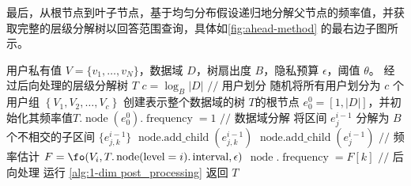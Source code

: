最后，从根节点到叶子节点，\myahead 基于均匀分布假设递归地分解父节点的频率值，并获取完整的层级分解树以回答范围查询，具体如\autoref{fig:ahead-method} 的最右边子图所示。

\begin{algorithm}[!htbp]
	\begin{algorithmic}[1]
        \REQUIRE 用户私有值 $V=\{v_1, \ldots, v_N\}$，数据域 $D$，树扇出度 $B$，隐私预算 $\epsilon$，阈值 $\theta$。
        \ENSURE 经过后向处理的\myahead 层级分解树 $T$
		\STATE $c = {\log_B}|D|$
		\STATE $//$ 用户划分
        \STATE 随机将所有用户划分为 $c$ 个用户组 $\left\{ V_1, V_2, \ldots, V_c \right\}$
        \STATE 创建表示整个数据域的树 $T$的根节点 $e^0_0 = [1, |D|]$，并初始化其频率值$T.\operatorname{node}(e^0_0).\operatorname{frequency} = 1$
            \STATE $//$ 数据域分解
            \STATE 将区间 $e^{i-1}_j$ 分解为 $B$ 个不相交的子区间 $\{e^{i-1}_{j,k}\}$
    		\STATE $\operatorname{node.add\_child}(e^{i-1}_{j,k})$
            \ENDFOR
            \ELSE
            \STATE $\operatorname{node.add\_child}(e^{i-1}_{j})$
            \ENDIF    		
            \ENDFOR
            \STATE $//$ 频率估计
            \STATE $F = \fo(V_i, T.\operatorname{node}(\operatorname{level}=i).\operatorname{interval}, \epsilon)$
    		\STATE $\operatorname{node}.\operatorname{frequency} = F[k]$
            \ENDFOR
        \ENDFOR
        \STATE $//$ 后向处理
        \STATE 运行 \autoref{alg:1-dim post_processing}
        \STATE 返回 $T$
	\end{algorithmic}
    \caption{构建一维\myahead 层级分解树}
    \label{Construct 1-dim prototype tree}
\end{algorithm}

